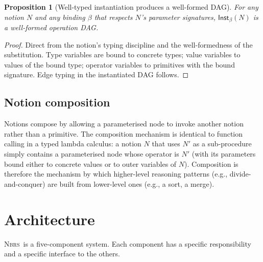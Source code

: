 \documentclass[11pt,a4paper]{article}
\theoremstyle{plain}
\newtheorem{proposition}[theorem]{Proposition}
\theoremstyle{definition}
\theoremstyle{remark}
\newcommand{\NBRS}{\textsc{Nbrs}}
\newcommand{\Inst}{\mathsf{Inst}}
\begin{document}
\begin{proposition}[Well-typed instantiation produces a well-formed DAG]
\label{prop:inst-wellformed}
For any notion $N$ and any binding $\beta$ that respects $N$'s parameter signatures, $\Inst_\beta(N)$ is a well-formed operation DAG.
\end{proposition}

\begin{proof}
Direct from the notion's typing discipline and the well-formedness of the substitution. Type variables are bound to concrete types; value variables to values of the bound type; operator variables to primitives with the bound signature. Edge typing in the instantiated DAG follows.
\end{proof}

\subsection{Notion composition}

Notions compose by allowing a parameterised node to invoke another notion rather than a primitive. The composition mechanism is identical to function calling in a typed lambda calculus: a notion $N$ that uses $N'$ as a sub-procedure simply contains a parameterised node whose operator is $N'$ (with its parameters bound either to concrete values or to outer variables of $N$). Composition is therefore the mechanism by which higher-level reasoning patterns (e.g., divide-and-conquer) are built from lower-level ones (e.g., a sort, a merge).

\section{Architecture}
\label{sec:architecture}

\NBRS\ is a five-component system. Each component has a specific responsibility and a specific interface to the others.
\end{document}
